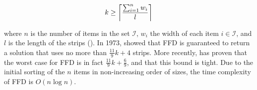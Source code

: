 \documentclass[oribibl]{llncs}
\begin{document}
\begin{equation}
	k \geq \ceil*{\frac{\sum_{i=1}^{n}w_i}{l}}
\end{equation}

where $n$ is the number of items in the set $\mathcal{I}$, $w_i$ the width of each item $i \in \mathcal{I}$, and $l$ is the length of the strips (\citealp{martello1990b}). In 1973, \citeauthor{johnson1973} showed that FFD is guaranteed to return a solution that uses no more than $\frac{11}{9}k + 4$ strips. More recently, \cite{dosa2007} has proven that the worst case for FFD is in fact $\frac{11}{9}k + \frac{6}{9}$, and that this bound is tight. Due to the initial sorting of the $n$ items in non-increasing order of sizes, the time complexity of FFD is $O(n\log n)$.


















































\end{document}

